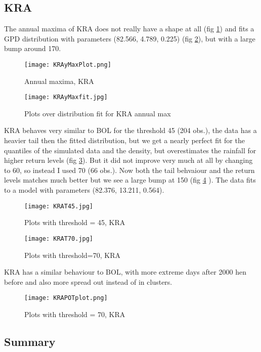 \documentclass{article}
\begin{document}
 	\subsection{KRA}
 	The annual maxima of KRA does not really have a shape at all (fig \ref{KRAyMax}) and fits a GPD distribution with parameters (82.566, 4.789, 0.225) (fig \ref{KRAyMfit}), but with a large bump around 170.
 	\begin{figure}[H]
 		\centering
 		\texttt{[image: KRAyMaxPlot.png]}
 		\caption{Annual maxima, KRA}
 		\label{KRAyMax}
 	\end{figure}
 	\begin{figure}[H]
 		\centering
 		\texttt{[image: KRAyMaxfit.jpg]}
 		\caption{Plots over distribution fit for KRA annual max}
 		\label{KRAyMfit}
 	\end{figure}
 	KRA behaves very similar to BOL for the threshold 45 (204 obs.), the data has a heavier tail then the fitted distribution, but we get a nearly perfect fit for the quantiles of the simulated data and the density, but overestimates the rainfall for higher return levels (fig \ref{KRAT45}). But it did not improve very much at all by changing to 60, so instead I used 70 (66 obs.). Now both the tail behvaiour and the return levels matches much better but we see a large bump at 150 (fig \ref{KRAT70} ). The data fits to a model with parameters (82.376, 13.211, 0.564). 
 	\begin{figure}[H]
 		\centering
 		\texttt{[image: KRAT45.jpg]}
 		\caption{Plots with threshold = 45, KRA}
 		\label{KRAT45}
 	\end{figure}
 	\begin{figure}[H]
 		\centering
 		\texttt{[image: KRAT70.jpg]}
 		\caption{Plots with threshold=70, KRA}
 		\label{KRAT70}
 	\end{figure}
	KRA has a similar behaviour to BOL, with more extreme days after 2000 hen before and also more spread out instead of in clusters. 
	\begin{figure}[H]
		\centering
		\texttt{[image: KRAPOTplot.png]}
		\caption{Plots with threshold = 70, KRA}
		\label{KRAPOT}
	\end{figure} 
	\subsection{Summary}
	
\end{document}

